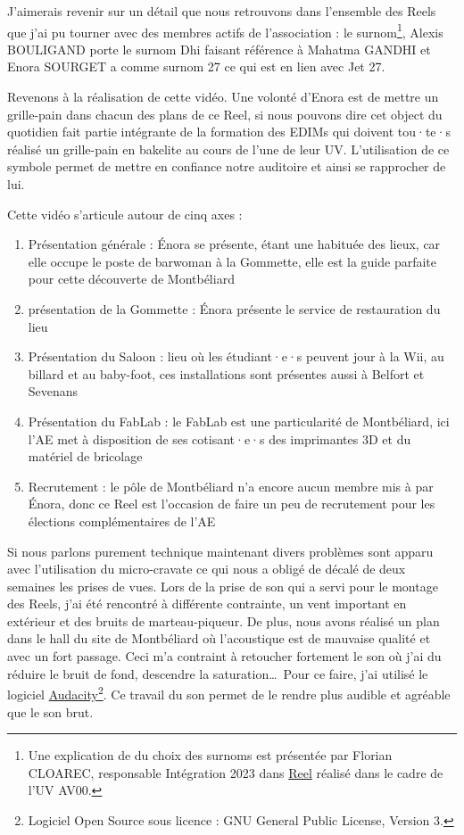 J'aimerais revenir sur un détail que nous retrouvons dans l'ensemble des Reels que j'ai pu tourner avec des membres actifs de l'association : le surnom\footnote{Une explication de du choix des surnoms est présentée par Florian CLOAREC, responsable Intégration 2023 dans \href{https://www.instagram.com/reel/Cws1eRdr-wV/?utm_source=ig_web_copy_link&igshid=MzRlODBiNWFlZA==}{Reel} réalisé dans le cadre de l'UV AV00.}, Alexis BOULIGAND porte le surnom Dhi faisant référence à Mahatma GANDHI et Enora SOURGET a comme surnom 27 ce qui est en lien avec Jet 27.

Revenons à la réalisation de cette vidéo.
Une volonté d'Enora est de mettre un grille-pain dans chacun des plans de ce Reel, si nous pouvons dire cet object du quotidien fait partie intégrante de la formation des EDIMs qui doivent tou·te·s réalisé un grille-pain en bakelite au cours de l'une de leur UV.
L'utilisation de ce symbole permet de mettre en confiance notre auditoire et ainsi se rapprocher de lui.

Cette vidéo s'articule autour de cinq axes :
\begin{enumerate}
    \item Présentation générale : Énora se présente, étant une habituée des lieux, car elle occupe le poste de barwoman à la Gommette, elle est la guide parfaite pour cette découverte de Montbéliard
    \item présentation de la Gommette : Énora présente le service de restauration du lieu
    \item Présentation du Saloon : lieu où les étudiant·e·s peuvent jour à la Wii, au billard et au baby-foot, ces installations sont présentes aussi à Belfort et Sevenans
    \item Présentation du FabLab : le FabLab est une particularité de Montbéliard, ici l'\gls{AE} met à disposition de ses cotisant·e·s des imprimantes 3D et du matériel de bricolage
    \item Recrutement : le pôle de Montbéliard n'a encore aucun membre mis à par Énora, donc ce Reel est l'occasion de faire un peu de recrutement pour les élections complémentaires de l'\gls{AE}
\end{enumerate}


Si nous parlons purement technique maintenant divers problèmes sont apparu avec l'utilisation du micro-cravate ce qui nous a obligé de décalé de deux semaines les prises de vues.
Lors de la prise de son qui a servi pour le montage des Reels, j'ai été rencontré à différente contrainte, un vent important en extérieur et des bruits de marteau-piqueur.
De plus, nous avons réalisé un plan dans le hall du site de Montbéliard où l'acoustique est de mauvaise qualité et avec un fort passage.
Ceci m'a contraint à retoucher fortement le son où j'ai du réduire le bruit de fond, descendre la saturation\ldots\
Pour ce faire, j'ai utilisé le logiciel \href{https://www.audacityteam.org}{Audacity}\footnote{Logiciel Open Source sous licence : GNU General Public License, Version 3.}.
Ce travail du son permet de le rendre plus audible et agréable que le son brut.

